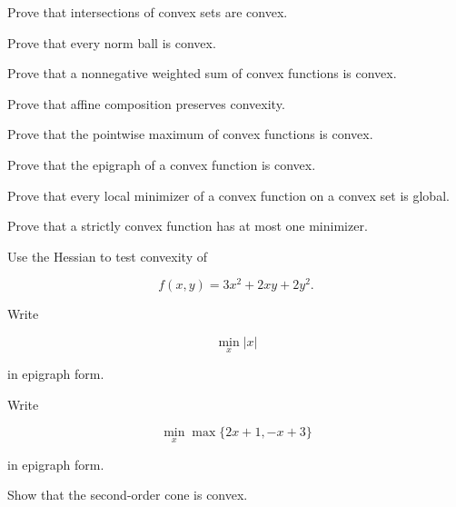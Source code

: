 \begin{exercise}[3]
Prove that intersections of convex sets are convex.
\end{exercise}

\begin{exercise}[3]
Prove that every norm ball is convex.
\end{exercise}

\begin{exercise}[3]
Prove that a nonnegative weighted sum of convex functions is convex.
\end{exercise}

\begin{exercise}[3]
Prove that affine composition preserves convexity.
\end{exercise}

\begin{exercise}[3]
Prove that the pointwise maximum of convex functions is convex.
\end{exercise}

\begin{exercise}[3]
Prove that the epigraph of a convex function is convex.
\end{exercise}

\begin{exercise}[3]
Prove that every local minimizer of a convex function on a convex set is
global.
\end{exercise}

\begin{exercise}[3]
Prove that a strictly convex function has at most one minimizer.
\end{exercise}

\begin{exercise}[3]
Use the Hessian to test convexity of

\[
f(x,y)
=
3x^2+2xy+2y^2.
\]
\end{exercise}

\begin{exercise}[3]
Write

\[
\min_x |x|
\]

in epigraph form.
\end{exercise}

\begin{exercise}[3]
Write

\[
\min_x
\max
\{
2x+1,
-x+3
\}
\]

in epigraph form.
\end{exercise}

\begin{exercise}[3]
Show that the second-order cone is convex.
\end{exercise}


